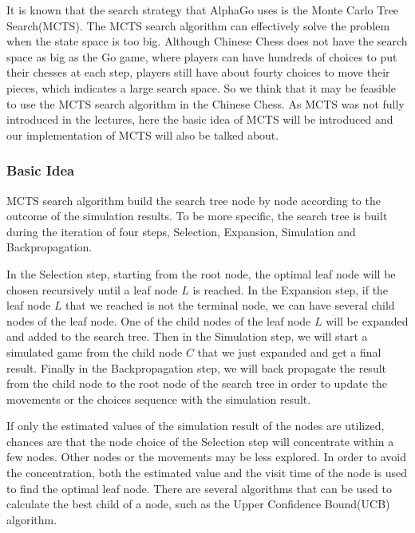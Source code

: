 It is known that the search strategy that AlphaGo uses is the Monte Carlo Tree Search(MCTS). 
The MCTS search algorithm can effectively solve the problem when the state space is too big. 
Although Chinese Chess does not have the search space as big as the Go game, where players can have hundreds of choices to put their chesses at each step, players still have about fourty choices to move their pieces, which indicates a large search space. 
So we think that it may be feasible to use the MCTS search algorithm in the Chinese Chess. 
As MCTS was not fully introduced in the lectures, here the basic idea of MCTS will be introduced and our implementation of MCTS will also be talked about. 
\subsubsection{Basic Idea}
MCTS search algorithm build the search tree node by node according to the outcome of the simulation results. 
To be more specific, the search tree is built during the iteration of four steps, Selection, Expansion, Simulation and Backpropagation. 

In the Selection step, starting from the root node, the optimal leaf node will be chosen recursively until a leaf node $L$ is reached. 
In the Expansion step, if the leaf node $L$ that we reached is not the terminal node, we can have several child nodes of the leaf node. 
One of the child nodes of the leaf node $L$ will be expanded and added to the search tree. 
Then in the Simulation step, we will start a simulated game from the child node $C$ that we just expanded and get a final result. 
Finally in the Backpropagation step, we will back propagate the result from the child node to the root node of the search tree in order to update the movements or the choices sequence with the simulation result. 

If only the estimated values of the simulation result of the nodes are utilized, chances are that the node choice of the Selection step will concentrate within a few nodes. 
Other nodes or the movements may be less explored. 
In order to avoid the concentration, both the estimated value and the visit time of the node is used to find the optimal leaf node. 
There are several algorithms that can be used to calculate the best child of a node, such as the Upper Confidence Bound(UCB) algorithm. 

